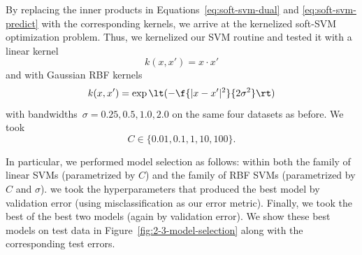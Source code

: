 \documentclass{article}
\begin{document}
\begin{multicols}{2}
By replacing the inner products in
Equations~\ref{eq:soft-svm-dual} and \ref{eq:soft-svm-predict}
with the corresponding kernels,
we arrive at the kernelized soft-SVM optimization problem.
Thus, we kernelized our SVM routine
and tested it with a linear kernel
\begin{equation}
    k(x, x') = x\cdot x'
\end{equation}
and with Gaussian RBF kernels
\begin{equation}
    k(x, x') = \exp\lt(-\f{|x - x'|^2}{2\sigma^2}\rt)
\end{equation}
with bandwidths~$\sigma=0.25,0.5,1.0,2.0$ on the same four datasets as before.
We took
\[
    C \in \{0.01, 0.1, 1, 10, 100\}.
\]

In particular, we performed model selection as follows:
within both the family of linear SVMs (parametrized by $C$)
and the family of RBF SVMs (parametrized by $C$ and $\sigma$).
we took the hyperparameters that produced the best model by validation error
(using misclassification as our error metric).
Finally, we took the best of the best two models (again by validation error).
We show these best models on test data in Figure~\ref{fig:2-3-model-selection}
along with the corresponding test errors.


\end{multicols}
\end{document}
